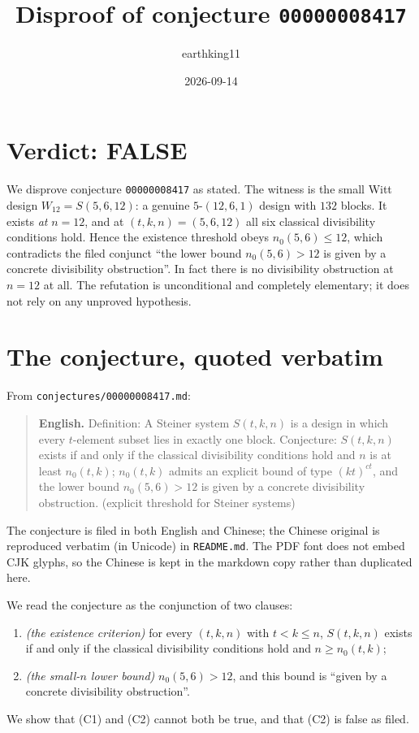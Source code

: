 \documentclass[11pt]{article}
\title{Disproof of conjecture \texttt{00000008417}}
\author{earthking11}
\date{2026-09-14}
\theoremstyle{definition}
\theoremstyle{remark}
\newcommand{\Wtwelve}{W_{12}}
\begin{document}
\maketitle

\section*{Verdict: FALSE}

We disprove conjecture \texttt{00000008417} as stated. The witness is the small
Witt design $\Wtwelve = S(5,6,12)$: a genuine $5$-$(12,6,1)$ design with $132$
blocks. It exists \emph{at} $n = 12$, and at $(t,k,n) = (5,6,12)$ all six
classical divisibility conditions hold. Hence the existence threshold obeys
$n_0(5,6) \le 12$, which contradicts the filed conjunct ``the lower bound
$n_0(5,6) > 12$ is given by a concrete divisibility obstruction''. In fact there
is no divisibility obstruction at $n = 12$ at all. The refutation is
unconditional and completely elementary; it does not rely on any unproved
hypothesis.

\section{The conjecture, quoted verbatim}

From \texttt{conjectures/00000008417.md}:

\begin{quote}
\textbf{English.} Definition: A Steiner system $S(t,k,n)$ is a design in which
every $t$-element subset lies in exactly one block. Conjecture: $S(t,k,n)$
exists if and only if the classical divisibility conditions hold and $n$ is at
least $n_0(t,k)$; $n_0(t,k)$ admits an explicit bound of type $(kt)^{ct}$, and
the lower bound $n_0(5,6) > 12$ is given by a concrete divisibility obstruction.
(explicit threshold for Steiner systems)
\end{quote}

The conjecture is filed in both English and Chinese; the Chinese original is
reproduced verbatim (in Unicode) in \texttt{README.md}. The PDF font does not
embed CJK glyphs, so the Chinese is kept in the markdown copy rather than
duplicated here.

We read the conjecture as the conjunction of two clauses:
\begin{enumerate}
\item[(C1)] \emph{(the existence criterion)} for every $(t,k,n)$ with
  $t < k \le n$, $S(t,k,n)$ exists if and only if the classical divisibility
  conditions hold and $n \ge n_0(t,k)$;
\item[(C2)] \emph{(the small-$n$ lower bound)} $n_0(5,6) > 12$, and this bound
  is ``given by a concrete divisibility obstruction''.
\end{enumerate}
We show that (C1) and (C2) cannot both be true, and that (C2) is false as filed.
\end{document}
